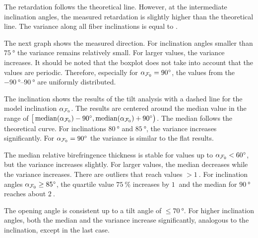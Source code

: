 The retardation follows the theoretical line.
However, at the intermediate inclination angles, the measured retardation is slightly higher than the theoretical line.
The variance along all fiber inclinations is equal to \modelInc{}.
\par
%
The next graph shows the measured direction.
For inclination angles smaller than $\SI{75}{\degree}$ the variance remains relatively small.
For larger values, the variance increases.
It should be noted that the boxplot does not take into account that the values are periodic.
Therefore, especially for $\textnormal{$\alpha_{\textnormal{$\mathcal{F}_0$}}$}=\SI{90}{\degree}$, the values from the $\SIrange{-90}{90}{\degree}$ are uniformly distributed.
\par
%
The inclination shows the results of the tilt analysis with a dashed line for the model inclination $\textnormal{$\alpha_{\textnormal{$\mathcal{F}_0$}}$}$.
The results are centered around the median value in the range of $\big[\operatorname{median} (\textnormal{$\alpha_{\textnormal{$\mathcal{F}_0$}}$})-\SI{90}{\degree}, \operatorname{median}(\textnormal{$\alpha_{\textnormal{$\mathcal{F}_0$}}$})+\SI{90}{\degree}\big)$.
The median follows the theoretical curve.
For inclinations $\SI{80}{\degree}$ and $\SI{85}{\degree}$, the variance increases significantly.
For $\textnormal{$\alpha_{\textnormal{$\mathcal{F}_0$}}$} = \SI{90}{\degree}$ the variance is similar to the flat results.
\par
%
The median relative birefringence thickness \trel{} is stable for values up to $\textnormal{$\alpha_{\textnormal{$\mathcal{F}_0$}}$} < \SI{60}{\degree}$, but the variance increases slightly.
For larger values, the median decreases while the variance increases.
There are outliers that reach values $>\SI{1}{}$.
For inclination angles $\textnormal{$\alpha_{\textnormal{$\mathcal{F}_0$}}$} \ge \SI{85}{\degree}$, the quartile value $\SI{75}{\percent}$ increases by $\SI{1}{}$ and the median for $\SI{90}{\degree}$ reaches about $\SI{2}{}$.
\par
%
The opening angle \openingAngle{} is consistent up to a tilt angle of $\le \SI{70}{\degree}$.
For higher inclination angles, both the median and the variance increase significantly, analogous to the inclination, except in the last case.
%
%
%
